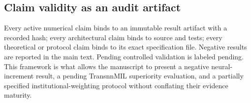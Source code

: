 \subsection{Claim validity as an audit artifact}

Every active numerical claim binds to an immutable result artifact with a
recorded hash; every architectural claim binds to source and tests; every
theoretical or protocol claim binds to its exact specification file. Negative
results are reported in the main text. Pending controlled validation is labeled
pending. This framework is what allows the manuscript to present a negative
neural-increment result, a pending TransnnMIL superiority evaluation, and a
partially specified institutional-weighting protocol without conflating their
evidence maturity.
